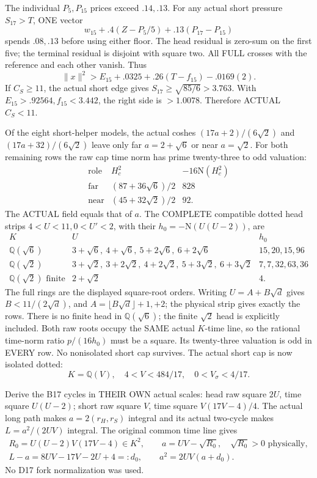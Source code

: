 The individual \(P_5,P_{15}\) prices exceed
\(.14,.13\).
For any actual short pressure \(S_{17}>T\),
ONE vector
\[
 w_{15}+.4(Z-P_5/5)+.13(P_{17}-P_{15})
\]
spends \(.08,.13\) before using either floor.
The head residual is zero-sum on the first five;
the terminal residual is disjoint with square two.
All FULL crosses with the reference and each
other vanish.
Thus
\[
                 \|x\|^2>
                 E_{15}+.0325+.26(T-f_{15})-.0169(2).
\]
If \(C_S\ge11\), the actual short edge gives
\(S_{17}\ge\sqrt{85/6}>3.763\).
With \(E_{15}>.92564,f_{15}<3.442\),
the right side is \(>1.0078\).
Therefore ACTUAL \(C_S<11\).

Of the eight short-helper models, the actual
coshes
\((17a+2)/(6\sqrt2)\) and
\((17a+32)/(6\sqrt2)\)
leave only far \(a=2+\sqrt6\) or near
\(a=\sqrt2\).
For both remaining rows the raw cap time norm
has prime twenty-three to odd valuation:
\[
\begin{array}{c|c|c}
 \text{role}&H_c^2&-16\mathrm N(H_c^2)\\ \hline
 \text{far}&(87+36\sqrt6)/2&828\\
 \text{near}&(45+32\sqrt2)/2&92 .
\end{array}
\]
The ACTUAL field equals that of \(a\).
The COMPLETE compatible dotted head strips
\(4<U<11,0<U'<2\), with their
\(h_0=-\mathrm N(U(U-2))\), are
\[
\begin{array}{c|l|l}
 K&U&h_0\\ \hline
 \mathbb Q(\sqrt6)&
 3+\sqrt6,\ 4+\sqrt6,\ 5+2\sqrt6,\ 6+2\sqrt6&
 15,20,15,96\\
 \mathbb Q(\sqrt2)&
 3+\sqrt2,\ 3+2\sqrt2,\ 4+2\sqrt2,\ 5+3\sqrt2,\ 6+3\sqrt2&
 7,7,32,63,36\\
 \mathbb Q(\sqrt2)\text{ finite}&2+\sqrt2&4 .
\end{array}
\]
The full rings are the displayed square-root
orders.
Writing \(U=A+B\sqrt d\) gives
\(B<11/(2\sqrt d)\), and
\(A=\lfloor B\sqrt d\rfloor+1,+2\);
the physical strip gives exactly the rows.
There is no finite head in \(\mathbb Q(\sqrt6)\);
the finite \(\sqrt2\) head is explicitly included.
Both raw roots occupy the SAME actual \(K\)-time
line, so the rational time-norm ratio
\(p/(16h_0)\) must be a square.
Its twenty-three valuation is odd in EVERY row.
No nonisolated short cap survives.
The actual short cap is now isolated dotted:
\[
                 K=\mathbb Q(V),\quad
                 4<V<484/17,\quad0<V_\sigma<4/17 .
\]

Derive the B17 cycles in THEIR OWN actual scales:
head raw square \(2U\), time square \(U(U-2)\);
short raw square \(V\), time square \(V(17V-4)/4\).
The actual long path makes
\(a=2(r_H,r_S)\) integral and its actual
two-cycle makes \(L=a^2/(2UV)\) integral.
The original common time line gives
\[
 \begin{gathered}
 R_0=U(U-2)V(17V-4)\in K^2,\qquad
 a=UV-\sqrt{R_0},\quad\sqrt{R_0}>0\text{ physically},\\
 L-a=8UV-17V-2U+4=:d_0,\qquad
 a^2=2UV(a+d_0).
 \end{gathered}
\tag{B17C}\label{eq:arithB17cycles}
\]
No D17 fork normalization was used.

